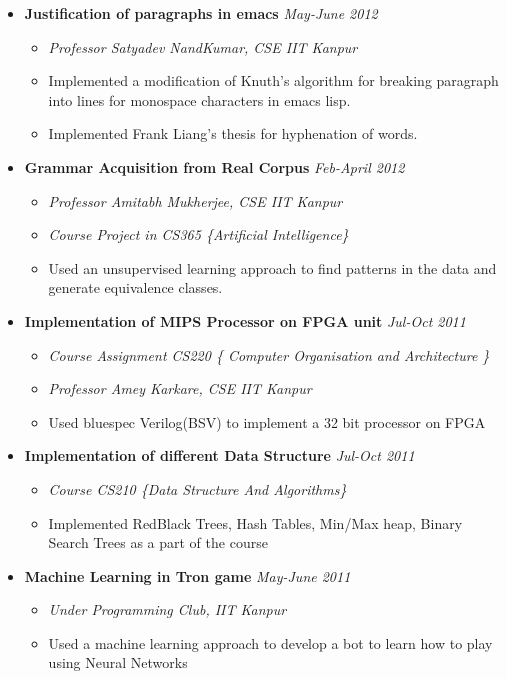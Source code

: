 \documentclass[11pt]{article}
\begin{document}
\begin{itemize}
\item {\normalsize \bf Justification of paragraphs in emacs} \hfill \emph{May-June 2012}
  \small
  \begin{itemize}
  \item \emph{Professor Satyadev NandKumar, CSE IIT Kanpur}
  \item Implemented a modification of Knuth's algorithm for breaking paragraph into lines for monospace characters in emacs lisp.
  \item Implemented Frank Liang's thesis for hyphenation of words.
  \end{itemize}
\item {\normalsize \bf Grammar Acquisition from Real Corpus} \hfill \emph{Feb-April 2012}
  \begin{itemize}
  \item \emph{Professor Amitabh Mukherjee, CSE IIT Kanpur} 
  \item \emph{Course Project in CS365 \{Artificial Intelligence\}}
  \item Used an unsupervised learning approach to find patterns in the data and generate equivalence classes.
  \end{itemize}
\item {\normalsize \bf Implementation of MIPS Processor on FPGA unit }\hfill \emph{Jul-Oct 2011}
  \begin{itemize}
  \item \emph {Course Assignment CS220 \{ Computer Organisation and Architecture \} }
  \item \emph {Professor Amey Karkare, CSE IIT Kanpur}
  \item Used bluespec Verilog(BSV) to implement a 32 bit processor on FPGA
	\end{itemize}
\item {\normalsize \bf Implementation of different Data Structure} \hfill \emph{Jul-Oct 2011}
  \begin{itemize}
  \item \emph{Course CS210 \{Data Structure And Algorithms\}}
  \item Implemented RedBlack Trees, Hash Tables, Min/Max heap, Binary Search Trees as a part of the course
  \end{itemize}
\item {\normalsize \bf Machine Learning in Tron game} \hfill \emph{May-June 2011}
  \begin{itemize}
  \item \emph{Under Programming Club, IIT Kanpur}
  \item Used a machine learning approach to develop a bot to learn how to play using Neural Networks\\
  \end{itemize}
\end{itemize}
\end{document}
